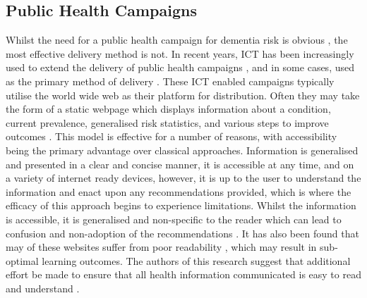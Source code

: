  \subsection{Public Health Campaigns}
Whilst the need for a public health campaign for dementia risk is obvious \cite{cook2014public}, the most effective delivery method is not. In recent years, ICT has been increasingly used to extend the delivery of public health campaigns \cite{Mirarchi2015}, and in some cases, used as the primary method of delivery \cite{Hattink2015}. These ICT enabled campaigns typically utilise the world wide web as their platform for distribution. Often they may take the form of a static webpage which displays information about a condition, current prevalence, generalised risk statistics, and various steps to improve outcomes \cite{AlzheimersAssociation2015a}. This model is effective for a number of reasons, with accessibility being the primary advantage over classical approaches. Information is generalised and presented in a clear and concise manner, it is accessible at any time, and on a variety of internet ready devices, however, it is up to the user to understand the information and enact upon any recommendations provided, which is where the efficacy of this approach begins to experience limitations. Whilst the information is accessible, it is generalised and non-specific to the reader which can lead to confusion and non-adoption of the recommendations \cite{lerouge2014challenges, Tones1994}. It has also been found that may of these websites suffer from poor readability \cite{RisoldiCochrane2012}, which may result in sub-optimal learning outcomes. The authors of this research suggest that additional effort be made to ensure that all health information communicated is easy to read and understand \cite{RisoldiCochrane2012}.

